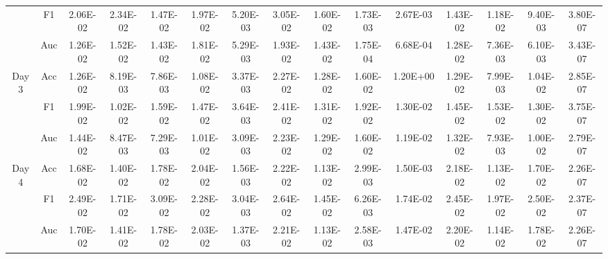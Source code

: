\begin{table}[tb]
{\begin{tabular}{|c|c|c|c|c|c|c|c|c|c|c|c|c|c|c|}
                                    & F1         & 2.06E-02                 & 2.34E-02                 & 1.47E-02                & 1.97E-02                   & 5.20E-03 & 3.05E-02   & 1.60E-02       & 1.73E-03 & 2.67E-03   & 1.43E-02       & 1.18E-02 & 9.40E-03   & 3.80E-07 \\
                                    & Auc        & 1.26E-02                 & 1.52E-02                 & 1.43E-02                & 1.81E-02                   & 5.29E-03 & 1.93E-02   & 1.43E-02       & 1.75E-04 & 6.68E-04   & 1.28E-02       & 7.36E-03 & 6.10E-03   & 3.43E-07 \\
            \hline
            \multirow{3}{*}{ Day 3} & Acc        & 1.26E-02                 & 8.19E-03                 & 7.86E-03                & 1.08E-02                   & 3.37E-03 & 2.27E-02   & 1.28E-02       & 1.60E-02 & 1.20E+00   & 1.29E-02       & 7.99E-03 & 1.04E-02   & 2.85E-07 \\
                                    & F1         & 1.99E-02                 & 1.02E-02                 & 1.59E-02                & 1.47E-02                   & 3.64E-03 & 2.41E-02   & 1.31E-02       & 1.92E-02 & 1.30E-02   & 1.45E-02       & 1.53E-02 & 1.30E-02   & 3.75E-07 \\
                                    & Auc        & 1.44E-02                 & 8.47E-03                 & 7.29E-03                & 1.01E-02                   & 3.09E-03 & 2.23E-02   & 1.29E-02       & 1.60E-02 & 1.19E-02   & 1.32E-02       & 7.93E-03 & 1.00E-02   & 2.79E-07 \\
            \hline
            \multirow{3}{*}{ Day 4} & Acc        & 1.68E-02                 & 1.40E-02                 & 1.78E-02                & 2.04E-02                   & 1.56E-03 & 2.22E-02   & 1.13E-02       & 2.99E-03 & 1.50E-03   & 2.18E-02       & 1.13E-02 & 1.70E-02   & 2.26E-07 \\
                                    & F1         & 2.49E-02                 & 1.71E-02                 & 3.09E-02                & 2.28E-02                   & 3.04E-03 & 2.64E-02   & 1.45E-02       & 6.26E-03 & 1.74E-02   & 2.45E-02       & 1.97E-02 & 2.50E-02   & 2.37E-07 \\
                                    & Auc        & 1.70E-02                 & 1.41E-02                 & 1.78E-02                & 2.03E-02                   & 1.37E-03 & 2.21E-02   & 1.13E-02       & 2.58E-03 & 1.47E-02   & 2.20E-02       & 1.14E-02 & 1.78E-02   & 2.26E-07 \\
            \hline

\end{tabular}}
\end{table}
